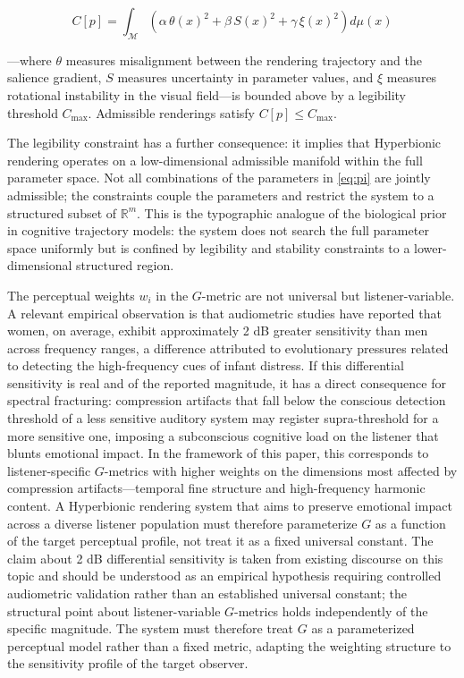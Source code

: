 \documentclass[12pt, a4paper]{article}
\begin{document}
\begin{equation}
C[p] = \int_{\mathcal{M}} \left(\alpha\, \theta(x)^2 + \beta\, S(x)^2 + \gamma\, \xi(x)^2\right) d\mu(x)
\label{eq:Cp}
\end{equation}

---where $\theta$ measures misalignment between the rendering trajectory and the salience gradient, $S$ measures uncertainty in parameter values, and $\xi$ measures rotational instability in the visual field---is bounded above by a legibility threshold $C_{\max}$. Admissible renderings satisfy $C[p] \leq C_{\max}$.

The legibility constraint has a further consequence: it implies that Hyperbionic rendering operates on a low-dimensional admissible manifold within the full parameter space. Not all combinations of the parameters in \eqref{eq:pi} are jointly admissible; the constraints couple the parameters and restrict the system to a structured subset of $\mathbb{R}^m$. This is the typographic analogue of the biological prior in cognitive trajectory models: the system does not search the full parameter space uniformly but is confined by legibility and stability constraints to a lower-dimensional structured region.

The perceptual weights $w_i$ in the $G$-metric are not universal but listener-variable. A relevant empirical observation is that audiometric studies have reported that women, on average, exhibit approximately 2 dB greater sensitivity than men across frequency ranges, a difference attributed to evolutionary pressures related to detecting the high-frequency cues of infant distress. If this differential sensitivity is real and of the reported magnitude, it has a direct consequence for spectral fracturing: compression artifacts that fall below the conscious detection threshold of a less sensitive auditory system may register supra-threshold for a more sensitive one, imposing a subconscious cognitive load on the listener that blunts emotional impact. In the framework of this paper, this corresponds to listener-specific $G$-metrics with higher weights on the dimensions most affected by compression artifacts---temporal fine structure and high-frequency harmonic content. A Hyperbionic rendering system that aims to preserve emotional impact across a diverse listener population must therefore parameterize $G$ as a function of the target perceptual profile, not treat it as a fixed universal constant. The claim about 2 dB differential sensitivity is taken from existing discourse on this topic and should be understood as an empirical hypothesis requiring controlled audiometric validation rather than an established universal constant; the structural point about listener-variable $G$-metrics holds independently of the specific magnitude. The system must therefore treat $G$ as a parameterized perceptual model rather than a fixed metric, adapting the weighting structure to the sensitivity profile of the target observer.
\end{document}
